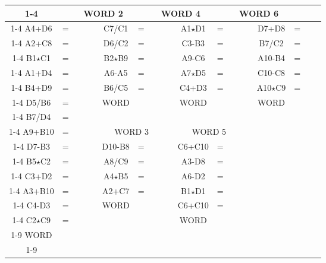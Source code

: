 \begin{center}
\def\CLine{\cline{1-4} \cline{6-9} \cline{11-14} \cline{16-19}}
\begin{tabular}{|c|@{}c@{}|c|c|@{}c@{}|c|@{}c@{}|c|c|@{}c@{}|c|@{}c@{}|c|c|@{}c@{}|c|@{}c@{}|c|c|}
\CLine
\multicolumn{4}{|c|}{WORD 1} & \hphantom{=} & \multicolumn{4}{c|}{WORD 2} & \hphantom{=} & \multicolumn{4}{c|}{WORD 4} & \hphantom{=} & \multicolumn{4}{c|}{WORD 6}\\ \CLine
A4+D6 & = & \hphantom{NO} & \hphantom{NO} & & C7/C1 & = & \hphantom{NO} & \hphantom{NO} & & A1$\star$D1 & = & \hphantom{NO} & \hphantom{NO} & & D7+D8 & = & \hphantom{NO} & \hphantom{NO}\\ \CLine
A2+C8 & = & \hphantom{NO} & \hphantom{NO} & & D6/C2 & = & \hphantom{NO} & \hphantom{NO} & & C3-B3 & = & \hphantom{NO} & \hphantom{NO} & & B7/C2 & = & \hphantom{NO} & \hphantom{NO}\\ \CLine
B1$\star$C1 & = & \hphantom{NO} & \hphantom{NO} & & B2$\star$B9 & = & \hphantom{NO} & \hphantom{NO} & & A9-C6 & = & \hphantom{NO} & \hphantom{NO} & & A10-B4 & = & \hphantom{NO} & \hphantom{NO}\\ \CLine
A1+D4 & = & \hphantom{NO} & \hphantom{NO} & & A6-A5 & = & \hphantom{NO} & \hphantom{NO} & & A7$\star$D5 & = & \hphantom{NO} & \hphantom{NO} & & C10-C8 & = & \hphantom{NO} & \hphantom{NO}\\ \CLine
B4+D9 & = & \hphantom{NO} & \hphantom{NO} & & B6/C5 & = & \hphantom{NO} & \hphantom{NO} & & C4+D3 & = & \hphantom{NO} & \hphantom{NO} & & A10$\star$C9 & = & \hphantom{NO} & \hphantom{NO}\\ \CLine
D5/B6 & = & \hphantom{NO} & \hphantom{NO} & & WORD & \multicolumn{3}{c|}{} & & WORD & \multicolumn{3}{c|}{} & & WORD & \multicolumn{3}{c|}{}\\ \CLine
B7/D4 & = & \hphantom{NO} & \hphantom{NO} & \multicolumn{15}{c}{}\\ \cline{1-4} \cline{6-9} \cline{11-14}
A9+B10 & = & & & & \multicolumn{4}{c|}{WORD 3} & & \multicolumn{4}{c|}{WORD 5} & \multicolumn{5}{c}{}\\ \cline{1-4} \cline{6-9} \cline{11-14}
D7-B3 & = & & & & D10-B8 &=& & & & C6+C10 &=& & & \multicolumn{5}{c}{}\\ \cline{1-4} \cline{6-9} \cline{11-14}
B5$\star$C2 & = & & & & A8/C9 &=& & & & A3-D8 &=& & & \multicolumn{5}{c}{}\\ \cline{1-4} \cline{6-9} \cline{11-14}
C3+D2 & = & & & & A4$\star$B5 &=& & & & A6-D2 &=& & & \multicolumn{5}{c}{}\\ \cline{1-4} \cline{6-9} \cline{11-14}
A3+B10 & = & & & & A2+C7 &=& & & & B1$\star$D1 &=& & & \multicolumn{5}{c}{}\\ \cline{1-4} \cline{6-9} \cline{11-14}
C4-D3 & = & & & & WORD & \multicolumn{3}{c|}{} & & C6+C10 &=& & & \multicolumn{5}{c}{}\\ \cline{1-4} \cline{6-9} \cline{11-14}
C2$\star$C9 & = & & & \multicolumn{5}{c}{} & & WORD & \multicolumn{3}{c|}{} & \multicolumn{5}{c}{}\\ \cline{1-9} \cline{11-14}
WORD & \multicolumn{8}{c|}{} & \multicolumn{10}{c}{}\\ \cline{1-9}
\end{tabular}


\end{center}
